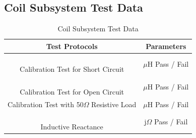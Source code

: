 \documentclass[12pt]{article}
\begin{document}
\begin{appendices}
\subsection{Coil Subsystem Test Data}
\begin{table}[h!]
\centering
\caption*{Coil Subsystem Test Data}
\begin{tabular}{ | c | c | }
\hline
\textbf{Test Protocols} & \textbf{Parameters} \\
\hline
\parbox{0.5\linewidth}{\raggedright \hfill \\[-0.25 em]
Calibration Test for Short Circuit
\hfill \\[0.1 em]} &  \parbox{0.4\linewidth}{\raggedright \hfill \\ [0.7 em] \underline{\hspace{0.625in}} 
$\mu$H
\hspace{0.125 in}Pass \space / \space  Fail \hfill \\ [0.3 em]} \\ 
\hline
\parbox{0.5\linewidth}{\raggedright \hfill \\[-0.25 em]
Calibration Test for Open Circuit
\hfill \\[0.1 em]} &  \parbox{0.4\linewidth}{\raggedright \hfill \\ [0.7 em]\underline{\hspace{0.625in}} 
$\mu$H
\hspace{0.125 in}Pass \space / \space  Fail \hfill \\ [0.3 em]} \\ 
\hline
\parbox{0.5\linewidth}{\raggedright \hfill \\[-0.25 em]
Calibration Test with 50$\Omega$ Resistive Load
\hfill \\[0.1 em]} &  \parbox{0.4\linewidth}{\raggedright \hfill \\ [0.7 em]\underline{\hspace{0.625in}} 
$\mu$H
\hspace{0.125 in}Pass \space / \space  Fail \hfill \\ [0.3 em]} \\ 
\hline
\parbox{0.5\linewidth}{\raggedright \hfill \\[-0.25 em]
Inductive Reactance
\hfill \\[0.1 em]} &  \parbox{0.4\linewidth}{\raggedright \hfill \\ [0.7 em]\underline{\hspace{0.625in}} 
j$\Omega$
\hspace{0.125 in}Pass \space / \space  Fail \hfill \\ [0.3 em]} \\ 

\end{tabular}
\end{table}
\end{appendices}
\end{document}
